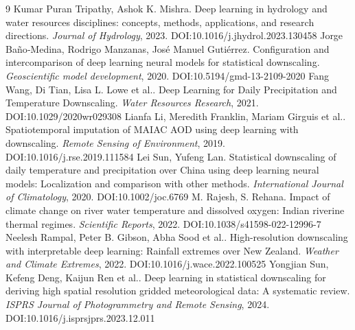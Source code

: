 \documentclass[11pt]{article}
\begin{document}
\begin{thebibliography}{9}
 Kumar Puran Tripathy, Ashok K. Mishra. Deep learning in hydrology and water resources disciplines: concepts, methods, applications, and research directions. \emph{Journal of Hydrology}, 2023. DOI:10.1016/j.jhydrol.2023.130458
 Jorge Baño‐Medina, Rodrigo Manzanas, José Manuel Gutiérrez. Configuration and intercomparison of deep learning neural models for statistical downscaling. \emph{Geoscientific model development}, 2020. DOI:10.5194/gmd-13-2109-2020
 Fang Wang, Di Tian, Lisa L. Lowe et al.. Deep Learning for Daily Precipitation and Temperature Downscaling. \emph{Water Resources Research}, 2021. DOI:10.1029/2020wr029308
 Lianfa Li, Meredith Franklin, Mariam Girguis et al.. Spatiotemporal imputation of MAIAC AOD using deep learning with downscaling. \emph{Remote Sensing of Environment}, 2019. DOI:10.1016/j.rse.2019.111584
 Lei Sun, Yufeng Lan. Statistical downscaling of daily temperature and precipitation over China using deep learning neural models: Localization and comparison with other methods. \emph{International Journal of Climatology}, 2020. DOI:10.1002/joc.6769
 M. Rajesh, S. Rehana. Impact of climate change on river water temperature and dissolved oxygen: Indian riverine thermal regimes. \emph{Scientific Reports}, 2022. DOI:10.1038/s41598-022-12996-7
 Neelesh Rampal, Peter B. Gibson, Abha Sood et al.. High-resolution downscaling with interpretable deep learning: Rainfall extremes over New Zealand. \emph{Weather and Climate Extremes}, 2022. DOI:10.1016/j.wace.2022.100525
 Yongjian Sun, Kefeng Deng, Kaijun Ren et al.. Deep learning in statistical downscaling for deriving high spatial resolution gridded meteorological data: A systematic review. \emph{ISPRS Journal of Photogrammetry and Remote Sensing}, 2024. DOI:10.1016/j.isprsjprs.2023.12.011
\end{thebibliography}
\end{document}
